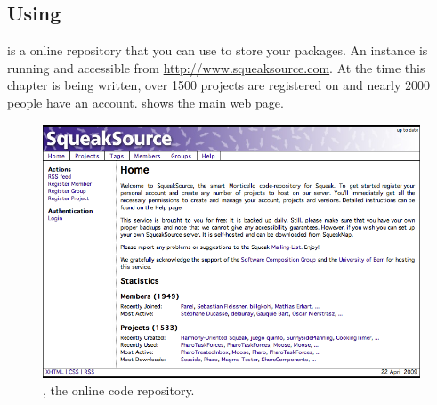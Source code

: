 \documentclass[a4paper,10pt,twoside]{book}
\begin{document}



\subsection{Using \sqsrc}

\indmain{\sqsrc} is a online repository that you can use to store your \MC packages. An instance is running and accessible from \url{http://www.squeaksource.com}. At the time this chapter is being written, over 1500 projects are registered on \sqsrc and nearly 2000 people have an account.  shows the main web page.  

\begin{figure}[ht]\centering
	\includegraphics[width=\textwidth]{squeaksource2}
	\caption{\sqsrc, the online \MC code repository.}
\end{figure}

\end{document}

